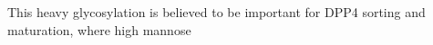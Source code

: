 This heavy glycosylation is believed to be important for DPP4 sorting and maturation, where high mannose \cite{Matter_1991}